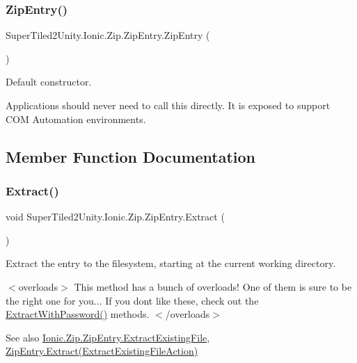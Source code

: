 \subsubsection{\texorpdfstring{Zip\+Entry()}{ZipEntry()}}
{\footnotesize\ttfamily Super\+Tiled2\+Unity.\+Ionic.\+Zip.\+Zip\+Entry.\+Zip\+Entry (\begin{DoxyParamCaption}{ }\end{DoxyParamCaption})}



Default constructor. 

Applications should never need to call this directly. It is exposed to support C\+OM Automation environments. 

\subsection{Member Function Documentation}
\mbox{\label{class_super_tiled2_unity_1_1_ionic_1_1_zip_1_1_zip_entry_a9d65543aadd23e47e188175412891b42}} 
\subsubsection{\texorpdfstring{Extract()}{Extract()}\hspace{0.1cm}{\footnotesize\ttfamily [1/5]}}
{\footnotesize\ttfamily void Super\+Tiled2\+Unity.\+Ionic.\+Zip.\+Zip\+Entry.\+Extract (\begin{DoxyParamCaption}{ }\end{DoxyParamCaption})}



Extract the entry to the filesystem, starting at the current working directory. 

$<$overloads$>$ This method has a bunch of overloads! One of them is sure to be the right one for you... If you don\textquotesingle{}t like these, check out the {\ttfamily \mbox{\hyperlink{class_super_tiled2_unity_1_1_ionic_1_1_zip_1_1_zip_entry_a346d1d4eaf4ccb1274fe31629f3cb429}{Extract\+With\+Password()}}} methods. $<$/overloads$>$

\begin{DoxySeeAlso}{See also}
\mbox{\hyperlink{class_super_tiled2_unity_1_1_ionic_1_1_zip_1_1_zip_entry_ad1ab903c29b91edb82e7c6a9768552dd}{Ionic.\+Zip.\+Zip\+Entry.\+Extract\+Existing\+File}}, \mbox{\hyperlink{class_super_tiled2_unity_1_1_ionic_1_1_zip_1_1_zip_entry_a0c740ca64fe50c0851e27d1324893ab9}{Zip\+Entry.\+Extract(\+Extract\+Existing\+File\+Action)}}


\end{DoxySeeAlso}


